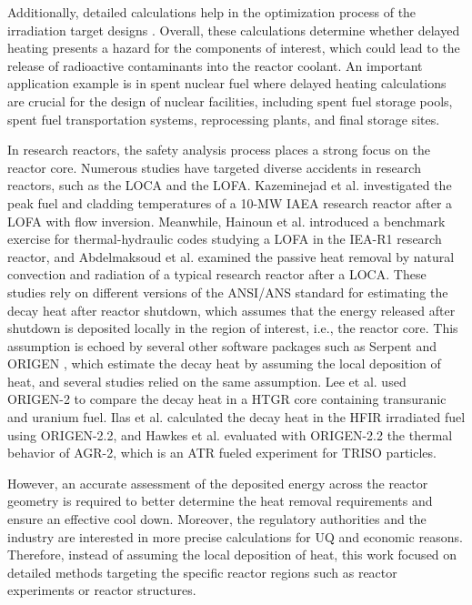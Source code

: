\documentclass{style/nseJournal}
\begin{document}
Additionally, detailed calculations help in the optimization process of the irradiation target designs \cite{peterson-droogh_current_2018}.
Overall, these calculations determine whether delayed heating presents a hazard for the components of interest, which could lead to the release of radioactive contaminants into the reactor coolant.
An important application example is in spent nuclear fuel where delayed heating calculations are crucial for the design of nuclear facilities, including spent fuel storage pools, spent fuel transportation systems, reprocessing plants, and final storage sites.

In research reactors, the safety analysis process places a strong focus on the reactor core.
Numerous studies have targeted diverse accidents in research reactors, such as the \gls*{LOCA} and the \gls*{LOFA}.
Kazeminejad et al. \cite{kazeminejad_thermal_2008} investigated the peak fuel and cladding temperatures of a 10-MW IAEA research reactor after a LOFA with flow inversion.
Meanwhile, Hainoun et al. \cite{hainoun_international_2014} introduced a benchmark exercise for thermal-hydraulic codes studying a LOFA in the IEA-R1 research reactor, and Abdelmaksoud et al. \cite{abdelmaksoud_analysis_2022} examined the passive heat removal by natural convection and radiation of a typical research reactor after a LOCA.
These studies rely on different versions of the ANSI/ANS standard \cite{ans_decay_1994} for estimating the decay heat after reactor shutdown, which assumes that the energy released after shutdown is deposited locally in the region of interest, i.e., the reactor core.
This assumption is echoed by several other software packages such as Serpent \cite{leppanen_serpent_2015, giot_decay_2018} and ORIGEN \cite{scale}, which estimate the decay heat by assuming the local deposition of heat, and several studies relied on the same assumption.
Lee et al. \cite{lee_decay_2010} used ORIGEN-2 to compare the decay heat in a \gls*{HTGR} core containing transuranic and uranium fuel.
Ilas et al. \cite{ilas_modeling_2015} calculated the decay heat in the \gls*{HFIR} irradiated fuel using ORIGEN-2.2, and Hawkes et al. \cite{hawkes_sensitivity_2015} evaluated with ORIGEN-2.2 the thermal behavior of AGR-2, which is an \gls*{ATR} fueled experiment for TRISO particles.

However, an accurate assessment of the deposited energy across the reactor geometry is required to better determine the heat removal requirements and ensure an effective cool down.
Moreover, the regulatory authorities and the industry are interested in more precise calculations for \gls*{UQ} and economic reasons.
Therefore, instead of assuming the local deposition of heat, this work focused on detailed methods targeting the specific reactor regions such as reactor experiments or reactor structures.
\end{document}
